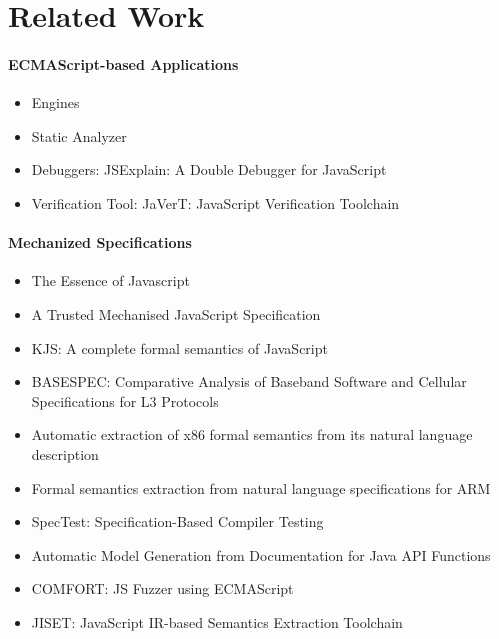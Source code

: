 \section{Related Work}\label{sec:related}

\paragraph{ECMAScript-based Applications}
\begin{itemize}
  \item Engines~\cite{v8, graaljs, qjs, moddable}
  \item Static Analyzer~\cite{safe, tajs, jsai, wala}
  \item Debuggers: JSExplain: A Double Debugger for JavaScript~\cite{jsexplain}
  \item Verification Tool: JaVerT: JavaScript Verification
    Toolchain~\cite{javert}
\end{itemize}

\paragraph{Mechanized Specifications}
\begin{itemize}
  \item The Essence of Javascript~\cite{lambdajs}
  \item A Trusted Mechanised JavaScript Specification~\cite{jscert}
  \item KJS: A complete formal semantics of JavaScript~\cite{kjs}

  \item BASESPEC: Comparative Analysis of Baseband Software and Cellular
    Specifications for L3 Protocols~\cite{basespec}
  \item Automatic extraction of x86 formal semantics from its natural
    language description~\cite{x86}
  \item Formal semantics extraction from natural language specifications for
    ARM~\cite{arm}
  \item SpecTest: Specification-Based Compiler Testing~\cite{spectest}
  \item Automatic Model Generation from Documentation for Java API Functions
  \item COMFORT: JS Fuzzer using ECMAScript
  \item JISET: JavaScript IR-based Semantics Extraction Toolchain~\cite{jiset}
\end{itemize}

